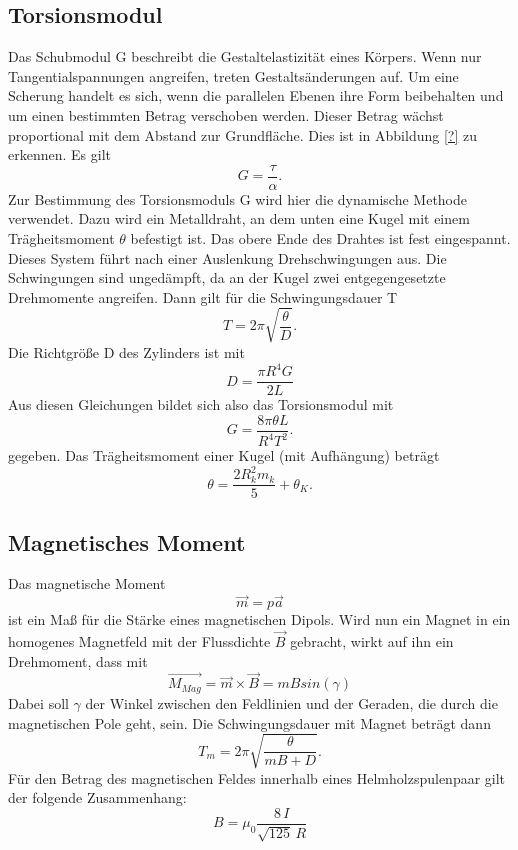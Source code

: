 \documentclass[11pt,ngerman,a4paper]{article}
\begin{document}
\subsection{Torsionsmodul}
Das Schubmodul G beschreibt die Gestaltelastizität eines Körpers. Wenn nur Tangentialspannungen angreifen, treten Gestaltsänderungen auf. Um eine Scherung handelt es sich, wenn die parallelen Ebenen ihre Form beibehalten und um einen bestimmten Betrag verschoben werden. Dieser Betrag wächst proportional mit dem Abstand zur Grundfläche. Dies ist in Abbildung \ref{?} zu erkennen.
Es gilt
\begin{equation}
\label{4}
G = \frac{\tau}{\alpha}.
\end{equation}
Zur Bestimmung des Torsionsmoduls G wird hier die dynamische Methode verwendet. Dazu wird ein Metalldraht, an dem unten eine Kugel mit einem Trägheitsmoment $\theta$ befestigt ist. Das obere Ende des Drahtes ist fest eingespannt. Dieses System führt nach einer Auslenkung Drehschwingungen aus. Die Schwingungen sind ungedämpft, da an der Kugel zwei entgegengesetzte Drehmomente angreifen.
Dann gilt für die Schwingungsdauer T
\begin{equation}
\label{5}
T=2\pi \sqrt{\frac{\theta}{D}}.
\end{equation}
Die Richtgröße D des Zylinders ist mit
\begin{equation}
\label{6}
D=\frac{\pi  R^4 G}{2L}
\end{equation}
Aus diesen Gleichungen bildet sich also das Torsionsmodul mit
\begin{equation}
\label{8}
G=\frac{8\pi\theta L}{R^4T^2}.
\end{equation}
gegeben. Das Trägheitsmoment einer Kugel (mit Aufhängung) beträgt
\begin{equation}
\label{7}
\theta=\frac{2R_k^2m_k}{5}+\theta_K.
\end{equation}

\subsection{Magnetisches Moment}
Das magnetische Moment
\begin{equation}
\label{9}
\vec{m}=p\vec{a} 
\end{equation}
ist ein Maß für die Stärke eines magnetischen Dipols. Wird nun ein Magnet in ein homogenes Magnetfeld mit der Flussdichte $\vec{B}$  gebracht, wirkt auf ihn ein Drehmoment, dass mit
\begin{equation}
\label{10}
\vec{M_{Mag}}=\vec{m} \times \vec{B} = m B sin(\gamma)
\end{equation}
Dabei soll $\gamma$ der Winkel zwischen den Feldlinien und der Geraden, die durch die magnetischen Pole geht, sein.
Die Schwingungsdauer mit Magnet beträgt dann
\begin{equation}
\label{11}
T_m=2\pi \sqrt{\frac{\theta}{mB+D}}.
\end{equation}
Für den Betrag des magnetischen Feldes innerhalb eines Helmholzspulenpaar gilt der folgende Zusammenhang:
\begin{equation}
B = \mu_0 \frac{8\,I}{\sqrt{125}\,R} 
\label{helm}
\end{equation}
\end{document}
